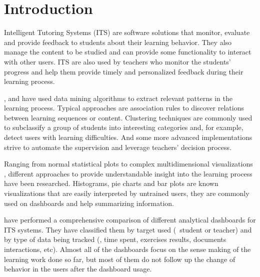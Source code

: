 \chapter{Introduction}\label{ch:introduction}


Intelligent Tutoring Systems (ITS) are software solutions that monitor, evaluate and provide feedback to students about their learning behavior. They also manage the content to be studied and can provide some functionality to interact with other users. ITS are also used by teachers who monitor the students’ progress and help them provide timely and personalized feedback during their learning process.

\citeauthor{Jugo2014} \cite{Jugo2014}, \citeauthor{Romero2008} \cite{Romero2008} and \citeauthor{Dogan2009} \cite{Dogan2009} have used data mining algorithms to extract relevant patterns in the learning process. Typical approaches are association rules to discover relations between learning sequences or content. Clustering techniques are commonly used to subclassify a group of students into interesting categories and, for example, detect users with learning difficulties. And some more advanced implementations strive to automate the supervision and leverage teachers' decision process.

Ranging from normal statistical plots \cite{Romero2008} to complex multidimensional visualizations \cite{Dogan2009}, different approaches to provide understandable insight into the learning process have been researched. Histograms, pie charts and bar plots are known visualizations that are easily interpreted by untrained users, they are commonly used on dashboards and help summarizing information.

\citeauthor{Verbert2013} \cite{Verbert2013} have performed a comprehensive comparison of different analytical dashboards for ITS systems. They have classified them by target used (\Ie\ student or teacher) and by type of data being tracked (\eg, time spent, exercises results, documents interactions, etc). Almost all of the dashboards focus on the sense making of the learning work done so far, but most of them do not follow up the change of behavior in the users after the dashboard usage.

